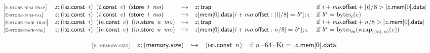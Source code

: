 $$
\begin{array}{@{}l@{}lcl@{}l@{}}
{[\textsc{\scriptsize E{-}store{-}num{-}trap}]} \quad & {\mathit{z}} ; (\mathsf{i{\scriptstyle32}}.\mathsf{const}~\,{\mathit{i}})~\,({\mathit{t}}.\mathsf{const}~\,{\mathit{c}})~\,(\mathsf{store}~\,{\mathit{t}}~\,{\mathit{mo}}) &\hookrightarrow& {\mathit{z}} ; \mathsf{trap} &\quad
  \mbox{if}~{\mathit{i}} + {\mathit{mo}}.\mathsf{offset} + {|{\mathit{t}}|} / 8 > {|{{\mathit{z}}.\mathsf{mem}}{{}[0]}.\mathsf{data}|} \\
{[\textsc{\scriptsize E{-}store{-}num{-}val}]} \quad & {\mathit{z}} ; (\mathsf{i{\scriptstyle32}}.\mathsf{const}~\,{\mathit{i}})~\,({\mathit{t}}.\mathsf{const}~\,{\mathit{c}})~\,(\mathsf{store}~\,{\mathit{t}}~\,{\mathit{mo}}) &\hookrightarrow& {\mathit{z}}{}[\mathsf{mem}{}[0].\mathsf{data}{}[{\mathit{i}} + {\mathit{mo}}.\mathsf{offset} : {|{\mathit{t}}|} / 8] = {{\mathit{b}}^\ast}] ; \epsilon &\quad
  \mbox{if}~{{\mathit{b}}^\ast} = {{\mathrm{bytes}}}_{{\mathit{t}}}({\mathit{c}}) \\
{[\textsc{\scriptsize E{-}store{-}pack{-}trap}]} \quad & {\mathit{z}} ; (\mathsf{i{\scriptstyle32}}.\mathsf{const}~\,{\mathit{i}})~\,({\mathsf{i}}{{\mathit{n}}}.\mathsf{const}~\,{\mathit{c}})~\,({\mathsf{i}}{{\mathit{n}}}.\mathsf{store}~\,{\mathit{n}}~\,{\mathit{mo}}) &\hookrightarrow& {\mathit{z}} ; \mathsf{trap} &\quad
  \mbox{if}~{\mathit{i}} + {\mathit{mo}}.\mathsf{offset} + {\mathit{n}} / 8 > {|{{\mathit{z}}.\mathsf{mem}}{{}[0]}.\mathsf{data}|} \\
{[\textsc{\scriptsize E{-}store{-}pack{-}val}]} \quad & {\mathit{z}} ; (\mathsf{i{\scriptstyle32}}.\mathsf{const}~\,{\mathit{i}})~\,({\mathsf{i}}{{\mathit{n}}}.\mathsf{const}~\,{\mathit{c}})~\,({\mathsf{i}}{{\mathit{n}}}.\mathsf{store}~\,{\mathit{n}}~\,{\mathit{mo}}) &\hookrightarrow& {\mathit{z}}{}[\mathsf{mem}{}[0].\mathsf{data}{}[{\mathit{i}} + {\mathit{mo}}.\mathsf{offset} : {\mathit{n}} / 8] = {{\mathit{b}}^\ast}] ; \epsilon &\quad
  \mbox{if}~{{\mathit{b}}^\ast} = {{\mathrm{bytes}}}_{{{\mathit{i}}}{{\mathit{n}}}}({{{\mathrm{wrap}}}_{({|{\mathsf{i}}{{\mathit{n}}}|},\, {\mathit{n}})}}{({\mathit{c}})}) \\
\end{array}
$$

\vspace{1ex}

$$
\begin{array}{@{}l@{}lcl@{}l@{}}
{[\textsc{\scriptsize E{-}memory.size}]} \quad & {\mathit{z}} ; (\mathsf{memory.size}) &\hookrightarrow& (\mathsf{i{\scriptstyle32}}.\mathsf{const}~\,{\mathit{n}}) &\quad
  \mbox{if}~{\mathit{n}} \cdot 64 \cdot {\mathrm{Ki}} = {|{{\mathit{z}}.\mathsf{mem}}{{}[0]}.\mathsf{data}|} \\
\end{array}
$$

